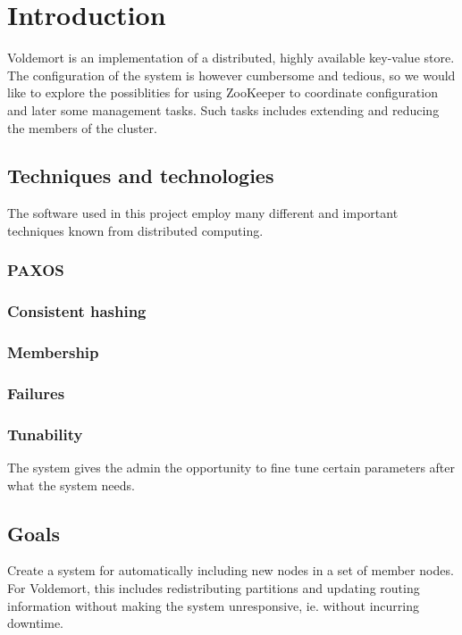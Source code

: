 
\section{Introduction}
Voldemort is an implementation of a distributed, highly available key-value store.
The configuration of the system is however cumbersome and tedious, so we would like to explore the possiblities for using ZooKeeper to coordinate configuration and later some management tasks.
Such tasks includes extending and reducing the members of the cluster.

\subsection{Techniques and technologies}
The software used in this project employ many different and important techniques known from distributed computing.

\subsubsection{PAXOS}

\subsubsection{Consistent hashing}

\subsubsection{Membership}

\subsubsection{Failures}

\subsubsection{Tunability}
The system gives the admin the opportunity to fine tune certain parameters after what the system needs.


\subsection{Goals}
Create a system for automatically including new nodes in a set of member nodes.
For Voldemort, this includes redistributing partitions and updating routing information without making the system unresponsive, ie. without incurring downtime.

\subsection{}

